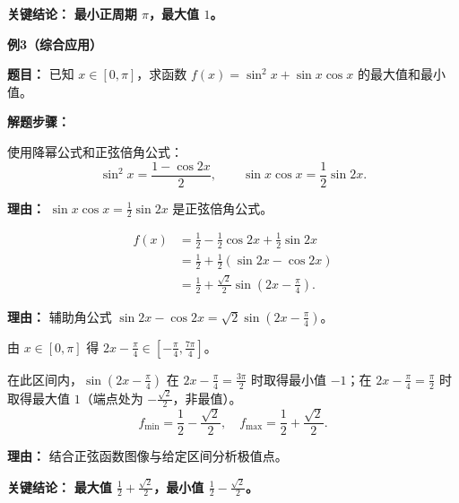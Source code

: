 \begin{examplebox}
	\textbf{\textcolor{CExample}{关键结论：}}
	\textbf{最小正周期 $\pi$，最大值 $1$。}

	\medskip
	\textbf{\textcolor{CExample}{例3（综合应用）}}

	\textbf{\textcolor{CExample}{题目：}}
	已知 $x\in[0,\pi]$，求函数 $f(x)=\sin^2 x + \sin x\cos x$ 的最大值和最小值。

	\textbf{\textcolor{CExample}{解题步骤：}}
	\begin{description}[style=nextline, leftmargin=2.8em, labelsep=0.5em, itemsep=0.45em]
		\item[\textbf{第一步（降幂与倍角）：}]
			使用降幂公式和正弦倍角公式：
			\[
				\sin^2 x = \frac{1-\cos 2x}{2},
				\qquad
				\sin x\cos x = \frac{1}{2}\sin 2x.
			\]
			\par\textbf{理由：} $\sin x\cos x = \frac{1}{2}\sin 2x$ 是正弦倍角公式。
		\item[\textbf{第二步（化简为一角一函）：}]
			\[
				\begin{aligned}
					f(x) &= \frac{1}{2} - \frac{1}{2}\cos 2x + \frac{1}{2}\sin 2x \\
					&= \frac{1}{2} + \frac{1}{2}(\sin 2x - \cos 2x) \\
					&= \frac{1}{2} + \frac{\sqrt{2}}{2}\sin\left(2x - \frac{\pi}{4}\right).
			\end{aligned}
			\]
			\par\textbf{理由：} 辅助角公式 $\sin 2x - \cos 2x = \sqrt{2}\sin(2x-\frac{\pi}{4})$。
		\item[\textbf{第三步（确定取值范围）：}]
			由 $x\in[0,\pi]$ 得 $2x-\frac{\pi}{4}\in[-\frac{\pi}{4},\frac{7\pi}{4}]$。

			在此区间内，$\sin(2x-\frac{\pi}{4})$ 在 $2x-\frac{\pi}{4}=\frac{3\pi}{2}$ 时取得最小值 $-1$；在 $2x-\frac{\pi}{4}=\frac{\pi}{2}$ 时取得最大值 $1$（端点处为 $-\frac{\sqrt{2}}{2}$，非最值）。
			\[
				f_{\min} = \frac12 - \frac{\sqrt{2}}{2},\quad f_{\max} = \frac12 + \frac{\sqrt{2}}{2}.
			\]
			\par\textbf{理由：} 结合正弦函数图像与给定区间分析极值点。
	\end{description}

	\textbf{\textcolor{CExample}{关键结论：}}
	\textbf{最大值 $\frac12 + \frac{\sqrt{2}}{2}$，最小值 $\frac12 - \frac{\sqrt{2}}{2}$。}
\end{examplebox}
